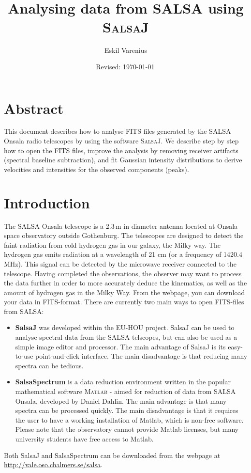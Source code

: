 \documentclass[11pt,a4paper]{article}
\begin{document}
\pagestyle{plain}
\title{\textsf{Analysing data from SALSA using \textsc{SalsaJ}}}
\author{\textsf{Eskil Varenius}}
\yyyymmdddate
\date{\textsf{Revised: \today \, \currenttime}}
 

\maketitle

\section*{Abstract}
This document describes how to analyse FITS files generated by the SALSA Onsala
radio telescopes by using the software \textsc{SalsaJ}.  We describe step by
step how to open the FITS files, improve the analysis by removing receiver
artifacts (spectral baseline subtraction), and fit Gaussian intensity
distributions to derive velocities and intensities for the observed components
(peaks).

\tableofcontents

\section{Introduction}
\label{sec:introduction}

The SALSA Onsala telescope is a 2.3\,m in diameter antenna located at
Onsala space observatory outside Gothenburg. The telescopes are
designed to detect the faint radiation from cold hydrogen gas in our
galaxy, the Milky way. The hydrogen gas emits radiation at a
wavelength of 21 cm (or a frequency of 1420.4 MHz). This signal can be
detected by the microwave receiver connected to the telescope. 
Having completed the observations, the observer may want to process
the data further in order to more accurately deduce the kinematics,
as well as the amount of hydrogen gas in the Milky Way. From the webpage,
you can download your data in FITS-format. There
are currently two main ways to open FITS-files from SALSA:

\begin{itemize}
\item \textbf{SalsaJ} was developed within the EU-HOU project.
	SalsaJ can be used to analyse spectral data from the SALSA telscopes, but
	can also be used as a simple image editor and processor.  The main
	advantage of SalsaJ is its easy-to-use point-and-click interface. The main
	disadvantage is that reducing many spectra can be tedious.
\item \textbf{SalsaSpectrum} is a data reduction environment written
  in the popular mathematical software \textsc{\textsc{Matlab}} -
  aimed for reduction of data from SALSA Onsala, developed by Daniel
  Dahlin. The main advantage is that many spectra can be processed
  quickly. The main disadvantage is that it requires the user to have
  a working installation of Matlab, which is non-free software. Please note 
  that the observatory cannot provide Matlab licenses, but many university
  students have free access to Matlab.
\end{itemize}
Both SalsaJ and SalsaSpectrum can be downloaded from the webpage at
{\url{http://vale.oso.chalmers.se/salsa}}. 
\end{document}
